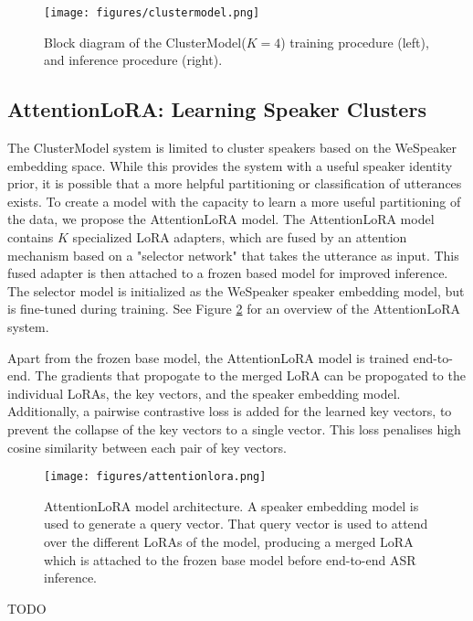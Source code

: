 \begin{figure}[h]
      \centering
      \texttt{[image: figures/clustermodel.png]}
      \caption{Block diagram of the ClusterModel($K=4$) training procedure (left), and inference procedure (right).}
      \label{fig:clustermodel}
\end{figure}

\subsection{AttentionLoRA: Learning Speaker Clusters}

The ClusterModel system is limited to cluster speakers based on the WeSpeaker embedding space.
While this provides the system with a useful speaker identity prior, it is possible that a more helpful partitioning or classification of utterances exists.
To create a model with the capacity to learn a more useful partitioning of the data, we propose the AttentionLoRA model.
The AttentionLoRA model contains $K$ specialized LoRA adapters, which are fused by an attention mechanism based on a "selector network" that takes the utterance as input.
This fused adapter is then attached to a frozen based model for improved inference.
The selector model is initialized as the WeSpeaker speaker embedding model, but is fine-tuned during training.
See Figure \ref{fig:attentionlora} for an overview of the AttentionLoRA system.


Apart from the frozen base model, the AttentionLoRA model is trained end-to-end.
The gradients that propogate to the merged LoRA can be propogated to the individual LoRAs, the key vectors, and the speaker embedding model.
Additionally, a pairwise contrastive loss is added for the learned key vectors, to prevent the collapse of the key vectors to a single vector.
This loss penalises high cosine similarity between each pair of key vectors.

\begin{figure}
      \centering
      \texttt{[image: figures/attentionlora.png]}
      \caption{AttentionLoRA model architecture. A speaker embedding model is used to generate a query vector.
      That query vector is used to attend over the different LoRAs of the model, producing a merged LoRA which is attached to the frozen base model before end-to-end ASR inference.}
      \label{fig:attentionlora}
\end{figure}

TODO
